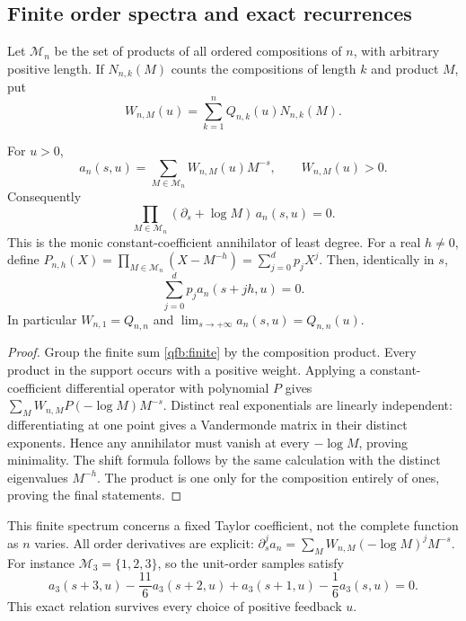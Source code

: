 \subsection{Finite order spectra and exact recurrences}
Let $\mathcal M_n$ be the set of products of all ordered compositions
of $n$, with arbitrary positive length. If $N_{n,k}(M)$ counts the
compositions of length $k$ and product $M$, put
\[
 W_{n,M}(u)=\sum_{k=1}^n Q_{n,k}(u)N_{n,k}(M).
\]
\begin{corollary}
\label{qfb:order-spectrum}
For $u>0$,
\begin{equation}\label{qfb:dirichlet}
 a_n(s,u)=\sum_{M\in\mathcal M_n}W_{n,M}(u)M^{-s},
 \qquad W_{n,M}(u)>0.
\end{equation}
Consequently
\begin{equation}\label{qfb:annihilator}
 \prod_{M\in\mathcal M_n}(\partial_s+\log M)\,a_n(s,u)=0.
\end{equation}
This is the monic constant-coefficient annihilator of least degree.
For a real $h\ne0$, define
$P_{n,h}(X)=\prod_{M\in\mathcal M_n}(X-M^{-h})
 =\sum_{j=0}^d p_jX^j$. Then, identically in $s$,
\begin{equation}\label{qfb:order-shift}
 \sum_{j=0}^d p_j a_n(s+jh,u)=0.
\end{equation}
In particular $W_{n,1}=Q_{n,n}$ and
$\lim_{s\to+\infty}a_n(s,u)=Q_{n,n}(u)$.
\end{corollary}
\begin{proof}
Group the finite sum \eqref{qfb:finite} by the composition product.
Every product in the support occurs with a positive weight. Applying a
constant-coefficient differential operator with polynomial $P$ gives
$\sum_M W_{n,M}P(-\log M)M^{-s}$. Distinct real exponentials are
linearly independent: differentiating at one point gives a Vandermonde
matrix in their distinct exponents. Hence any annihilator must vanish
at every $-\log M$, proving minimality. The shift formula follows by
the same calculation with the distinct eigenvalues $M^{-h}$.
The product is one only for the composition entirely of ones, proving
the final statements.
\end{proof}

This finite spectrum concerns a fixed Taylor coefficient, not the
complete function as $n$ varies. All order derivatives are explicit:
$\partial_s^j a_n=\sum_M W_{n,M}(-\log M)^jM^{-s}$.
For instance $\mathcal M_3=\{1,2,3\}$, so the unit-order samples satisfy
\[
 a_3(s+3,u)-\frac{11}{6}a_3(s+2,u)
          +a_3(s+1,u)-\frac16a_3(s,u)=0.
\]
This exact relation survives every choice of positive feedback $u$.

